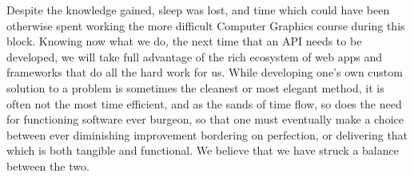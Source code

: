 \documentclass[12pt, a4paper, notitlepage]{report}
\begin{document}
		Despite the knowledge gained, sleep was lost, and time which could have been otherwise spent working the more difficult Computer Graphics course during this block. Knowing now what we do, the next time that an API needs to be developed, we will take full advantage of the rich ecosystem of web apps and frameworks that do all the hard work for us. While developing one's own custom solution to a problem is sometimes the cleanest or most elegant method, it is often not the most time efficient, and as the sands of time flow, so does the need for functioning software ever burgeon, so that one must eventually make a choice between ever diminishing improvement bordering on perfection, or delivering that which is both tangible and functional. We believe that we have struck a balance between the two.
\end{document}
